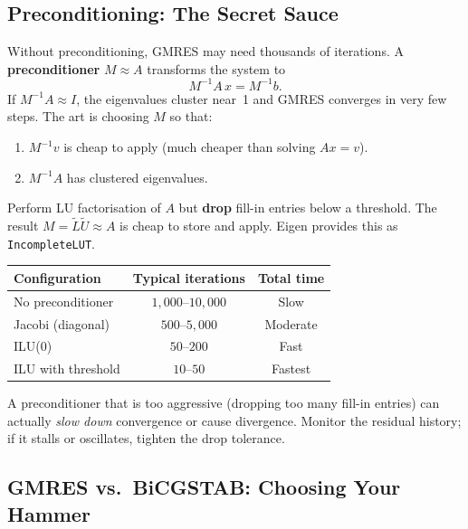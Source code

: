 \subsection{Preconditioning: The Secret Sauce}

Without preconditioning, GMRES may need thousands of iterations.
A \textbf{preconditioner} $M \approx A$ transforms the system to
\[
    M^{-1}A\,x = M^{-1}b.
\]
If $M^{-1}A \approx I$, the eigenvalues cluster near~1 and GMRES
converges in very few steps.  The art is choosing $M$ so that:

\begin{enumerate}[nosep]
    \item $M^{-1}v$ is cheap to apply (much cheaper than solving $Ax = v$).
    \item $M^{-1}A$ has clustered eigenvalues.
\end{enumerate}

\begin{definition}
Perform LU factorisation of $A$ but \textbf{drop} fill-in entries
below a threshold.  The result $M = \tilde{L}\tilde{U} \approx A$
is cheap to store and apply.  Eigen provides this as
\texttt{IncompleteLUT}.
\end{definition}

\begin{center}
\renewcommand{\arraystretch}{1.3}
\begin{tabular}{@{}lcc@{}}
\toprule
\textbf{Configuration} & \textbf{Typical iterations} & \textbf{Total time} \\
\midrule
No preconditioner      & $1{,}000$--$10{,}000$   & Slow \\
Jacobi (diagonal)      & $500$--$5{,}000$        & Moderate \\
ILU(0)                 & $50$--$200$             & Fast \\
ILU with threshold     & $10$--$50$              & Fastest \\
\bottomrule
\end{tabular}
\end{center}

\begin{warningbox}
A preconditioner that is too aggressive (dropping too many fill-in entries)
can actually \emph{slow down} convergence or cause divergence.
Monitor the residual history; if it stalls or oscillates, tighten the
drop tolerance.
\end{warningbox}

\subsection{GMRES vs.\ BiCGSTAB: Choosing Your Hammer}

